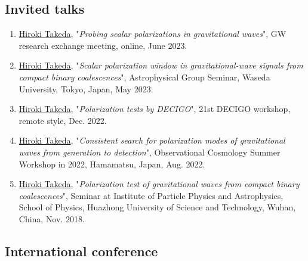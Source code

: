 \documentclass[uplatex, 12pt]{article}
\begin{document}
\subsection*{Invited talks}
\begin{enumerate}
\item \uline{Hiroki Takeda}, "\emph{Probing scalar polarizations in gravitational waves}", GW research exchange meeting, online, June 2023.\\

\item \uline{Hiroki Takeda}, "\emph{Scalar polarization window in gravitational-wave signals from compact binary coalescences}",
Astrophysical Group Seminar, Waseda University, Tokyo, Japan, May 2023.\\

\item \uline{Hiroki Takeda}, "\emph{Polarization tests by DECIGO}", 21st DECIGO workshop, remote style, Dec. 2022.\\

\item \uline{Hiroki Takeda}, "\emph{Consistent search for polarization modes of gravitational waves from generation to detection}", Observational Cosmology Summer Workshop in 2022,  Hamamatsu, Japan, Aug. 2022.\\

\item \uline{Hiroki Takeda}, "\emph{Polarization test of gravitational waves from compact binary coalescences}", Seminar at Institute of Particle Physics and Astrophysics, School of Physics, Huazhong University of Science and Technology, Wuhan, China, Nov. 2018.\\
\end{enumerate}


\subsection*{International conference}
\end{document}

